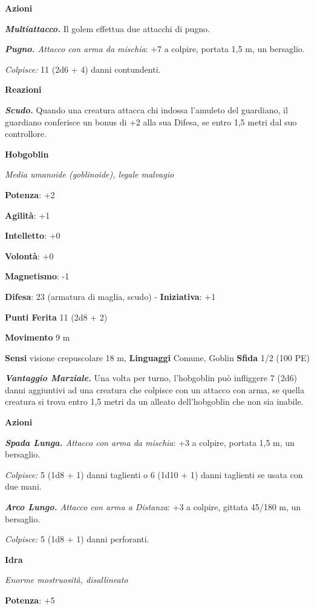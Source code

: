 \begin{multicols}{2}
\textbf{Azioni}

\emph{\textbf{Multiattacco.}} Il golem effettua due attacchi di pugno.

\emph{\textbf{Pugno.} Attacco con arma da mischia}: +7 a colpire,
portata 1,5 m, un bersaglio.

\emph{Colpisce:} 11 (2d6 + 4) danni contundenti.

\textbf{Reazioni}

\emph{\textbf{Scudo.}} Quando una creatura attacca chi indossa l'amuleto
del guardiano, il guardiano conferisce un bonus di +2 alla sua Difesa, se
entro 1,5 metri dal suo controllore.

\textbf{Hobgoblin}

\emph{Media umanoide (goblinoide), legale malvagio}

\textbf{Potenza}: +2

\textbf{Agilità}: +1

\textbf{Intelletto}: +0

\textbf{Volontà}: +0

\textbf{Magnetismo}: -1

\textbf{Difesa}: 23 (armatura di maglia, scudo) - \textbf{Iniziativa}: +1

\textbf{Punti Ferita} 11 (2d8 + 2)

\textbf{Movimento} 9 m

\textbf{Sensi} visione crepuscolare 18 m, 
\textbf{Linguaggi} Comune, Goblin \textbf{Sfida} 1/2 (100 PE)

\emph{\textbf{Vantaggio Marziale.}} Una volta per turno, l'hobgoblin può
infliggere 7 (2d6) danni aggiuntivi ad una creatura che colpisce con un
attacco con arma, se quella creatura si trova entro 1,5 metri da un
alleato dell'hobgoblin che non sia inabile.

\textbf{Azioni}

\emph{\textbf{Spada Lunga.} Attacco con arma da mischia}: +3 a colpire,
portata 1,5 m, un bersaglio.

\emph{Colpisce:} 5 (1d8 + 1) danni taglienti o 6 (1d10 + 1) danni
taglienti se usata con due mani.

\emph{\textbf{Arco Lungo.} Attacco con arma a Distanza}: +3 a colpire,
gittata 45/180 m, un bersaglio.

\emph{Colpisce:} 5 (1d8 + 1) danni perforanti.



\textbf{Idra}

\emph{Enorme mostruosità, disallineato}

\textbf{Potenza}: +5


\end{multicols}
